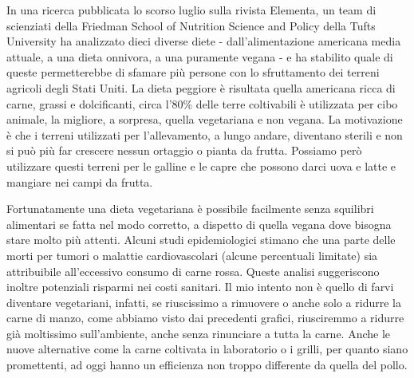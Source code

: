 \documentclass[12pt]{book} %
\begin{document}
In una ricerca pubblicata lo scorso luglio sulla rivista Elementa, un team di scienziati della Friedman School of Nutrition Science
and Policy della Tufts University ha analizzato dieci diverse diete - dall'alimentazione americana media attuale, a una
dieta onnivora, a una puramente vegana - e ha stabilito quale di queste permetterebbe di sfamare più persone con lo
sfruttamento dei terreni agricoli degli Stati Uniti. La dieta peggiore è risultata quella americana ricca di carne,
grassi e dolcificanti, circa l'80\% delle terre coltivabili è utilizzata per cibo animale, la
migliore, a sorpresa, quella vegetariana e non vegana. La motivazione è che i terreni utilizzati per
l'allevamento, a lungo andare, diventano sterili e non si può più far crescere nessun ortaggio o
pianta da frutta. Possiamo però utilizzare questi terreni per le galline e le capre che possono darci uova e latte e
mangiare nei campi da frutta.

Fortunatamente una dieta vegetariana è possibile facilmente senza squilibri alimentari se fatta nel modo corretto, a dispetto di quella vegana dove bisogna stare molto più attenti.
Alcuni studi epidemiologici stimano che una parte delle morti per tumori o malattie cardiovascolari (alcune percentuali limitate) sia attribuibile all’eccessivo consumo di carne rossa. Queste analisi suggeriscono inoltre potenziali risparmi nei costi sanitari.
Il mio intento non è quello di farvi diventare vegetariani, infatti, se riuscissimo a rimuovere o anche solo a ridurre la carne di manzo, come abbiamo visto dai precedenti grafici, riusciremmo a ridurre già moltissimo sull'ambiente, anche senza rinunciare a tutta la carne.
Anche le nuove alternative come la carne coltivata in laboratorio o i grilli, per quanto siano promettenti, ad oggi hanno un efficienza non troppo differente da quella del pollo.
\end{document}
